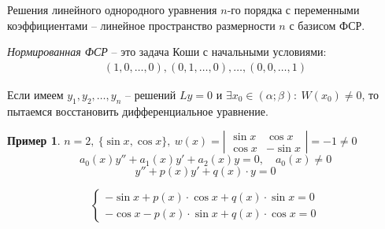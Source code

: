 \documentclass[11pt,a4paper,oneside]{report}
\theoremstyle{definition}
\newtheorem{example}{Пример}
\theoremstyle{plain}
\theoremstyle{remark}
\begin{document}
Решения линейного однородного уравнения $n$-го порядка с переменными коэффициентами -- линейное пространство размерности $n$ с базисом ФСР.

\emph{Нормированная ФСР} -- это задача Коши с начальными условиями:
\begin{eqnarray*}
    (1,0,\ldots,0),(0,1,\ldots,0),\ldots,(0,0,\ldots,1)
\end{eqnarray*}

Если имеем $y_1,y_2,\ldots,y_n$ -- решений $Ly = 0$ и $\exists x_0 \in (\alpha;\beta): \ W(x_0) \ne 0$, то пытаемся восстановить дифференциальное уравнение.

\begin{example}
    $n = 2, \ \{\sin x, \cos x\}, \ w(x) = \left|\begin{array}{cc}
            \sin x & \cos x   \\
            \cos x & - \sin x
        \end{array}\right| = -1 \ne 0$
    \begin{equation*}
        a_0(x)y'' + a_1(x)y' + a_2(x)y = 0, \quad a_0(x) \ne 0
    \end{equation*}
    \begin{equation*}
        y'' + p(x)y' + q(x) \cdot y = 0
    \end{equation*}

    \begin{equation*}
        \left\{\begin{array}{l}
            -\sin x + p(x) \cdot \cos x + q(x)\cdot \sin x = 0 \\
            -\cos x - p(x) \cdot \sin x + q(x)\cdot \cos x = 0
        \end{array}\right.
    \end{equation*}


\end{example}
\end{document}
